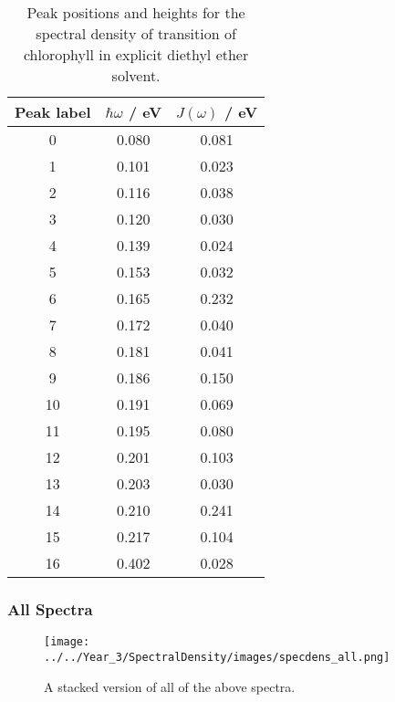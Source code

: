 \begin{table}
    \centering
    \begin{tabular}{||c c c||}
    \hline
    Peak label & $\hbar \omega$ / eV & $J\left(\omega\right)$ / eV \\
    \hline\hline
    
     0 & 0.080 & 0.081 \\
     1 & 0.101 & 0.023 \\
     2 & 0.116 & 0.038 \\
     3 & 0.120 & 0.030 \\
     4 & 0.139 & 0.024 \\
     5 & 0.153 & 0.032 \\
     6 & 0.165 & 0.232 \\
     7 & 0.172 & 0.040 \\
     8 & 0.181 & 0.041 \\
     9 & 0.186 & 0.150 \\
     10 & 0.191 & 0.069 \\
     11 & 0.195 & 0.080 \\
     12 & 0.201 & 0.103 \\
     13 & 0.203 & 0.030 \\
     14 & 0.210 & 0.241 \\
     15 & 0.217 & 0.104 \\
     16 & 0.402 & 0.028 \\
    \hline 
    \end{tabular}
    \caption{Peak positions and heights for the spectral density of \Qy transition
    of chlorophyll in explicit diethyl ether solvent.}
    \label{tab:ether_lablled_peaks}
\end{table}

\afterpartskip
\subsubsection{All Spectra}
\label{subsubsec:specdens_stacked}

\begin{figure}
    \centering
    \texttt{[image: ../../Year\_3/SpectralDensity/images/specdens\_all.png]}
    \caption{A stacked version of all of the above spectra.}
    \label{fig:app_all_spectra}
\end{figure}
